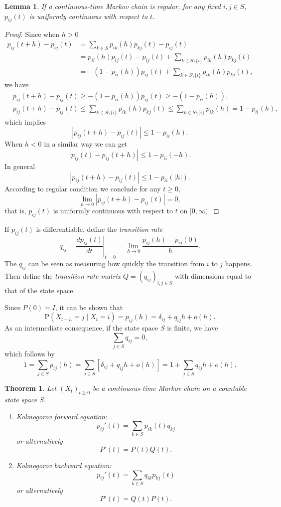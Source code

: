 \documentclass{article}
\newtheorem{theorem}{Theorem}[section]
\newtheorem{lemma}{Lemma}[section]
\theoremstyle{nonumberplain}
\newtheorem{proof}{Proof.}
\begin{document}
\begin{lemma}
	If a continuous-time Markov chain is regular, for any fixed $i,j\in S$, $p_{ij}(t)$ is uniformly continuous with respect to $t$. 
\end{lemma}
\begin{proof}
	Since when $h>0$
	\[
	\begin{aligned}
		p_{ij}(t+h)-p_{ij}(t)&=\sum_{k\in S}p_{ik}(h)p_{kj}(t)-p_{ij}(t)\\
		&= p_{ii}(h)p_{ij}(t)-p_{ij}(t)+\sum_{k\in S\setminus\{i\}}p_{ik}(h)p_{kj}(t)\\
		&= -(1-p_{ii}(h))p_{ij}(t)+\sum_{k\in S\setminus\{i\}}p_{ik}(h)p_{kj}(t),
	\end{aligned}
	\]
	we have
	\[
	\begin{aligned}
	&p_{ij}(t+h)-p_{ij}(t)\ge -(1-p_{ii}(h))p_{ij}(t)\ge-(1-p_{ii}(h)),\\
	&p_{ij}(t+h)-p_{ij}(t)\le\sum_{k\in S\setminus\{i\}} p_{ik}(h)p_{kj}(t)\le \sum_{k\in S\setminus\{i\}}p_{ik}(h)=1-p_{ii}(h),	
	\end{aligned}
	\]
	which implies
	\[
	|p_{ij}(t+h)-p_{ij}(t)|\le 1-p_{ii}(h).
	\]
	When $h<0$ in a similar way we can get
	\[
	|p_{ij}(t)-p_{ij}(t+h)|\le 1-p_{ii}(-h).
	\]
	In general
	\[
	|p_{ij}(t+h)-p_{ij}(t)|\le 1-p_{ii}(|h|).
	\]
	According to regular condition we conclude for any $t\ge0$,
	\[
	\lim_{h\to0}|p_{ij}(t+h)-p_{ij}(t)|=0,
	\]
	that is, $p_{ij}(t)$ is uniformly continuous with respect to $t$ on $[0,\infty)$.
\end{proof}
If $p_{ij}(t)$ is differentiable, define the \emph{transition rate} 
\[
q_{ij}=\left.\frac{dp_{ij}(t)}{dt}\right|_{t=0}=\lim\limits_{h\to 0}\frac{p_{ij}(h)-p_{ij}(0)}{h}.
\]
The $q_{ij}$ can be seen as measuring how quickly the transition from $i$ to $j$ happens. Then define the \emph{transition rate matrix} $Q=(q_{ij})_{i,j\in S}$ with dimensions equal to that of the state space. 

\noindent Since $P(0)=I$, it can be shown that
\[
\mathrm{P}(X_{t+h}=j\mid X_t=i)=p_{ij}(h)=\delta _{ij}+q_{ij}h+o(h). 
\]
As an intermediate consequence, if the state space $S$ is finite, we have   
\[
\sum_{j\in S}q_{ij}=0,
\]
which follows by
\[
1=\sum_{j\in S}p_{ij}(h)=\sum_{j\in S}[\delta _{ij}+q_{ij}h+o(h)]=1+\sum_{j\in S}q_{ij}h+o(h).
\]
\begin{theorem}
	Let $(X_t)_{t\ge0}$ be a continuous-time Markov chain on a countable state space $S$.
	\begin{enumerate}
		\item Kolmogorov forward equation:
		\[
		p_{ij}'(t)=\sum_{k\in S}p_{ik}(t)q_{kj}
		\]
		or alternatively
		\[
		P'(t)=P(t)Q(t).
		\]
		\item Kolmogorov backward equation:
		\[
		p_{ij}'(t)=\sum_{k\in S}q_{ik}p_{kj}(t)
		\]
		or alternatively
		\[
		P'(t)=Q(t)P(t).
		\]
	\end{enumerate}
\end{theorem}
\end{document}
